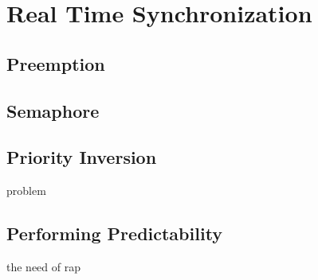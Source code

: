 \section{Real Time Synchronization}

 
\subsection{Preemption}

\subsection{Semaphore}

\subsection{Priority Inversion}
problem

\subsection{Performing Predictability}


the need of rap